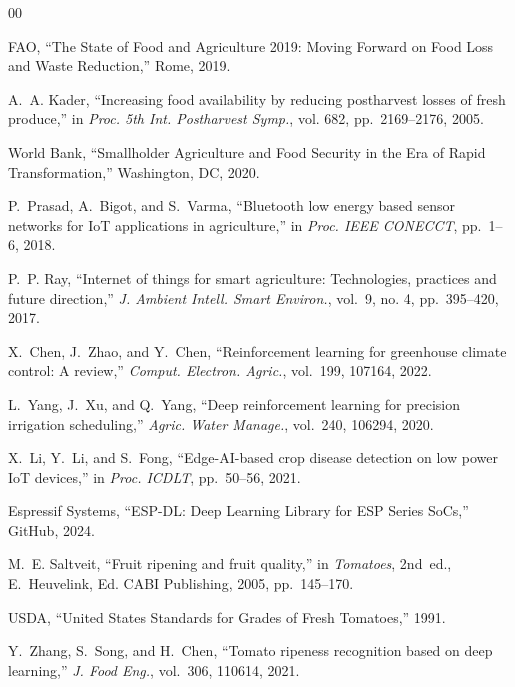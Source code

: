 \documentclass[conference]{IEEEtran}
\begin{document}
    \begin{thebibliography}{00}

    FAO, ``The State of Food and Agriculture 2019: Moving Forward on Food Loss and Waste Reduction,'' Rome, 2019.

    A.~A. Kader, ``Increasing food availability by reducing postharvest losses of fresh produce,'' in \textit{Proc. 5th Int. Postharvest Symp.}, vol. 682, pp.~2169--2176, 2005.

    World Bank, ``Smallholder Agriculture and Food Security in the Era of Rapid Transformation,'' Washington, DC, 2020.

    P.~Prasad, A.~Bigot, and S.~Varma, ``Bluetooth low energy based sensor networks for IoT applications in agriculture,'' in \textit{Proc. IEEE CONECCT}, pp.~1--6, 2018.

    P.~P. Ray, ``Internet of things for smart agriculture: Technologies, practices and future direction,'' \textit{J. Ambient Intell. Smart Environ.}, vol.~9, no. 4, pp.~395--420, 2017.

    X.~Chen, J.~Zhao, and Y.~Chen, ``Reinforcement learning for greenhouse climate control: A review,'' \textit{Comput. Electron. Agric.}, vol.~199, 107164, 2022.

    L.~Yang, J.~Xu, and Q.~Yang, ``Deep reinforcement learning for precision irrigation scheduling,'' \textit{Agric. Water Manage.}, vol.~240, 106294, 2020.

    X.~Li, Y.~Li, and S.~Fong, ``Edge-AI-based crop disease detection on low power IoT devices,'' in \textit{Proc. ICDLT}, pp.~50--56, 2021.

    Espressif Systems, ``ESP-DL: Deep Learning Library for ESP Series SoCs,'' GitHub, 2024.

    M.~E. Saltveit, ``Fruit ripening and fruit quality,'' in \textit{Tomatoes}, 2nd~ed., E.~Heuvelink, Ed.\hspace{0.2em} CABI Publishing, 2005, pp.~145--170.

    USDA, ``United States Standards for Grades of Fresh Tomatoes,'' 1991.

    Y.~Zhang, S.~Song, and H.~Chen, ``Tomato ripeness recognition based on deep learning,'' \textit{J. Food Eng.}, vol.~306, 110614, 2021.


\end{thebibliography}
\end{document}
